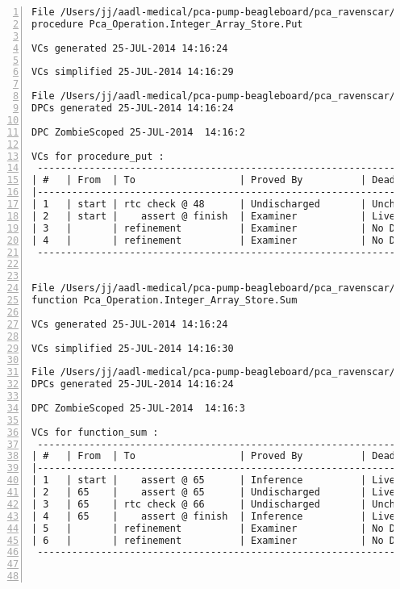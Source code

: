 \begin{lstlisting}[gobble=0, numbers=left, caption={POGS report for PCA Pump prototype}, label={listing:pca_ravenscar:pogs_full}]
File /Users/jj/aadl-medical/pca-pump-beagleboard/pca_ravenscar/pca_operation/integer_array_store/put.vcg
procedure Pca_Operation.Integer_Array_Store.Put

VCs generated 25-JUL-2014 14:16:24

VCs simplified 25-JUL-2014 14:16:29

File /Users/jj/aadl-medical/pca-pump-beagleboard/pca_ravenscar/pca_operation/integer_array_store/put.dpc
DPCs generated 25-JUL-2014 14:16:24

DPC ZombieScoped 25-JUL-2014  14:16:2

VCs for procedure_put :
 -----------------------------------------------------------------------------
| #   | From  | To                  | Proved By          | Dead Path | Status |
|-----------------------------------------------------------------------------
| 1   | start | rtc check @ 48      | Undischarged       | Unchecked |   UU   |
| 2   | start |    assert @ finish  | Examiner           | Live      |   EL   |
| 3   |       | refinement          | Examiner           | No DPC    |   E-   |
| 4   |       | refinement          | Examiner           | No DPC    |   E-   |
 -----------------------------------------------------------------------------


File /Users/jj/aadl-medical/pca-pump-beagleboard/pca_ravenscar/pca_operation/integer_array_store/sum.vcg
function Pca_Operation.Integer_Array_Store.Sum

VCs generated 25-JUL-2014 14:16:24

VCs simplified 25-JUL-2014 14:16:30

File /Users/jj/aadl-medical/pca-pump-beagleboard/pca_ravenscar/pca_operation/integer_array_store/sum.dpc
DPCs generated 25-JUL-2014 14:16:24

DPC ZombieScoped 25-JUL-2014  14:16:3

VCs for function_sum :
 -----------------------------------------------------------------------------
| #   | From  | To                  | Proved By          | Dead Path | Status |
|-----------------------------------------------------------------------------
| 1   | start |    assert @ 65      | Inference          | Live      |   IL   |
| 2   | 65    |    assert @ 65      | Undischarged       | Live      |   UL   |
| 3   | 65    | rtc check @ 66      | Undischarged       | Unchecked |   UU   |
| 4   | 65    |    assert @ finish  | Inference          | Live      |   IL   |
| 5   |       | refinement          | Examiner           | No DPC    |   E-   |
| 6   |       | refinement          | Examiner           | No DPC    |   E-   |
 -----------------------------------------------------------------------------



\end{lstlisting}
